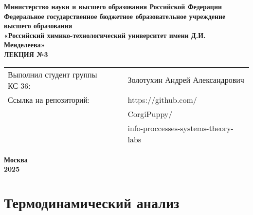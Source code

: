 \documentclass[12pt, a4paper]{report}
\begin{document}
	\begin{titlepage}
		\begin{center}
			\large \textbf{Министерство науки и высшего образования Российской Федерации} \\
			\large \textbf{Федеральное государственное бюджетное образовательное учреждение высшего образования} \\
			\large \textbf{«Российский химико-технологический университет имени Д.И. Менделеева»} \\

			\vspace*{6cm}
			\LARGE \textbf{ЛЕКЦИЯ №3}

			\vspace*{4cm}
			\begin{flushright}
				\Large
				\begin{tabular}{>{\raggedleft\arraybackslash}p{9cm} p{10cm}}
					Выполнил студент группы КС-36: & Золотухин Андрей Александрович \\
					Ссылка на репозиторий: & https://github.com/ \\
					& CorgiPuppy/ \\
					& info-proccesses-systems-theory-labs \\
				\end{tabular}
			\end{flushright}

			\vspace*{5cm}
			\Large \textbf{Москва \\ 2025}
		\end{center}
	\end{titlepage}

	\tableofcontents
	\thispagestyle{empty}
	\newpage


	\section*{Термодинамический анализ}
\end{document}
